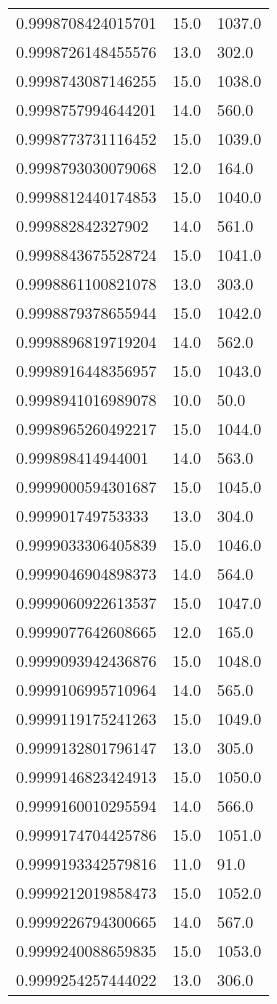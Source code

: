 \begin{center}
\begin{supertabular}[H]{p{0.30\textwidth}p{0.05\textwidth}p{0.05\textwidth}}
0.9998708424015701 & 15.0 & 1037.0 \\ 
0.9998726148455576 & 13.0 & 302.0 \\ 
0.9998743087146255 & 15.0 & 1038.0 \\ 
0.9998757994644201 & 14.0 & 560.0 \\ 
0.9998773731116452 & 15.0 & 1039.0 \\ 
0.9998793030079068 & 12.0 & 164.0 \\ 
0.9998812440174853 & 15.0 & 1040.0 \\ 
0.999882842327902 & 14.0 & 561.0 \\ 
0.9998843675528724 & 15.0 & 1041.0 \\ 
0.9998861100821078 & 13.0 & 303.0 \\ 
0.9998879378655944 & 15.0 & 1042.0 \\ 
0.9998896819719204 & 14.0 & 562.0 \\ 
0.9998916448356957 & 15.0 & 1043.0 \\ 
0.9998941016989078 & 10.0 & 50.0 \\ 
0.9998965260492217 & 15.0 & 1044.0 \\ 
0.999898414944001 & 14.0 & 563.0 \\ 
0.9999000594301687 & 15.0 & 1045.0 \\ 
0.999901749753333 & 13.0 & 304.0 \\ 
0.9999033306405839 & 15.0 & 1046.0 \\ 
0.9999046904898373 & 14.0 & 564.0 \\ 
0.9999060922613537 & 15.0 & 1047.0 \\ 
0.9999077642608665 & 12.0 & 165.0 \\ 
0.9999093942436876 & 15.0 & 1048.0 \\ 
0.9999106995710964 & 14.0 & 565.0 \\ 
0.9999119175241263 & 15.0 & 1049.0 \\ 
0.9999132801796147 & 13.0 & 305.0 \\ 
0.9999146823424913 & 15.0 & 1050.0 \\ 
0.9999160010295594 & 14.0 & 566.0 \\ 
0.9999174704425786 & 15.0 & 1051.0 \\ 
0.9999193342579816 & 11.0 & 91.0 \\ 
0.9999212019858473 & 15.0 & 1052.0 \\ 
0.9999226794300665 & 14.0 & 567.0 \\ 
0.9999240088659835 & 15.0 & 1053.0 \\ 
0.9999254257444022 & 13.0 & 306.0 \\ 

\end{supertabular}
\end{center}
